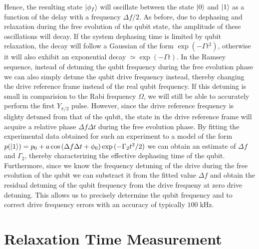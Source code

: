 Hence, the resulting state $\left| \phi_f \right>$ will oscillate between the state $\left| 0 \right>$ and $\left| 1 \right>$ as a function of the delay with a frequency $\Delta f/2$. As before, due to dephasing and relaxation during the free evolution of the qubit state, the amplitude of these oscillations will decay. If the system dephasing time is limited by qubit relaxation, the decay will follow a Gaussian of the form $\exp{(-\Gamma t^2)}$, otherwise it will also exhibit an exponential decay $\simeq \exp{(-\Gamma t)}$. In the Ramsey sequence, instead of detuning the qubit frequency during the free evolution phase we can also simply detune the qubit drive frequency instead, thereby changing the drive reference frame instead of the real qubit frequency. If this detuning is small in comparision to the Rabi frequency $\Omega$, we will still be able to accurately perform the first $Y_{\pi/2}$ pulse. However, since the drive reference frequency is slighty detuned from that of the qubit, the state in the drive reference frame will acquire a relative phase $\Delta f \Delta t$ during the free evolution phase. By fitting the experimental data obtained for such an experiment to a model of the form $p(\left| 1 \right>) = p_0 +a\cos{(\Delta f \Delta t+\phi_0)}\exp{(-\Gamma_2 t^2/2)}$ we can obtain an estimate of $\Delta f$ and $\Gamma_2$, thereby characterizing the effective dephasing time of the qubit. Furthermore, since we know the frequency detuning of the drive during the free evolution of the qubit we can substract it from the fitted value $\Delta f$ and obtain the residual detuning of the qubit frequency from the drive frequeny at zero drive detuning. This allows us to precisely determine the qubit frequency and to correct drive frequency errors with an accuracy of typically $100\;\mathrm{kHz}$. 

\section{Relaxation Time Measurement}

